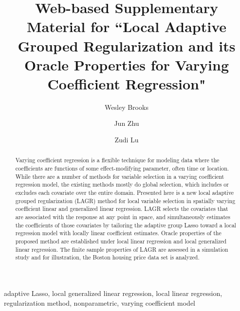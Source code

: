 \documentclass[authoryear,review, 12pt]{elsarticle}
\begin{document}
\begin{frontmatter}

\title{Web-based Supplementary Material for ``Local Adaptive Grouped Regularization and its Oracle Properties for Varying Coefficient Regression"}


\author[wrbrooks]{Wesley Brooks}

\author[jzhu]{Jun Zhu}

\author[zlu]{Zudi Lu}

\address[wrbrooks]{Department of Statistics, University of Wisconsin, Madison, WI 53706}
\address[jzhu]{Department of Statistics and Department of Entomology, University of Wisconsin, Madison, WI 53706}
\address[zlu]{School of Mathematical Sciences, The University of Southampton, Highfield, Southampton UK}

\begin{abstract}
Varying coefficient regression is a flexible technique for modeling data where the coefficients are functions of some effect-modifying parameter, often time or location. While there are a number of methods for variable selection in a varying coefficient regression model, the existing methods mostly do global selection, which includes or excludes each covariate over the entire domain. Presented here is a new local adaptive grouped regularization (LAGR) method for local variable selection in spatially varying coefficient linear and generalized linear regression. LAGR selects the covariates that are associated with the response at any point in space, and simultaneously estimates the coefficients of those covariates by tailoring the adaptive group Lasso toward a local regression model with locally linear coefficient estimates. Oracle properties of the proposed method are established under local linear regression and local generalized linear regression. The finite sample properties of LAGR are assessed in a simulation study and for illustration, the Boston housing price data set is analyzed.
\end{abstract}

\begin{keyword}
adaptive Lasso, local generalized linear regression, local linear regression, regularization method, nonparametric, varying coefficient model
\end{keyword}


\end{frontmatter}
\end{document}

